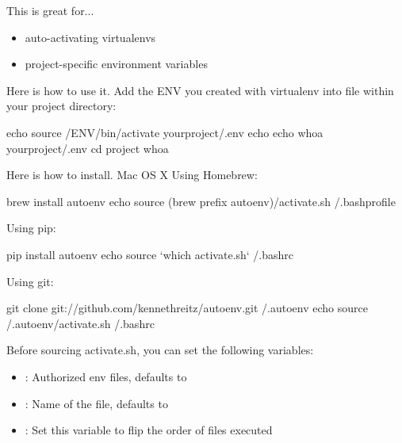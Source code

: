 This is great for...
\begin{itemize}
\item {} 
auto-activating virtualenvs

\item {} 
project-specific environment variables

\end{itemize}

Here is how to use it. Add the ENV you created with virtualenv into
 file within your project directory:

\begin{sphinxVerbatim}[commandchars=\\\{\}]
\PYGZdl{} echo \PYGZdq{}source \PYGZti{}/ENV/bin/activate\PYGZdq{} \PYGZgt{} yourproject/.env
\PYGZdl{} echo \PYGZdq{}echo \PYGZsq{}whoa\PYGZsq{}\PYGZdq{} \PYGZgt{} yourproject/.env
\PYGZdl{} cd project
whoa
\end{sphinxVerbatim}

Here is how to install.
Mac OS X Using Homebrew:

\begin{sphinxVerbatim}[commandchars=\\\{\}]
\PYGZdl{} brew install autoenv
\PYGZdl{} echo \PYGZdq{}source \PYGZdl{}(brew \PYGZhy{}\PYGZhy{}prefix autoenv)/activate.sh\PYGZdq{} \PYGZgt{}\PYGZgt{} \PYGZti{}/.bash\PYGZus{}profile
\end{sphinxVerbatim}

Using pip:

\begin{sphinxVerbatim}[commandchars=\\\{\}]
\PYGZdl{} pip install autoenv
\PYGZdl{} echo \PYGZdq{}source {}`which activate.sh{}`\PYGZdq{} \PYGZgt{}\PYGZgt{} \PYGZti{}/.bashrc
\end{sphinxVerbatim}

Using git:

\begin{sphinxVerbatim}[commandchars=\\\{\}]
\PYGZdl{} git clone git://github.com/kennethreitz/autoenv.git \PYGZti{}/.autoenv
\PYGZdl{} echo \PYGZsq{}source \PYGZti{}/.autoenv/activate.sh\PYGZsq{} \PYGZgt{}\PYGZgt{} \PYGZti{}/.bashrc
\end{sphinxVerbatim}

Before sourcing activate.sh, you can set the following variables:
\begin{itemize}
\item {} 
: Authorized env files, defaults to 

\item {} 
: Name of the  file, defaults to 

\item {} 
: Set this variable to flip the order of  files executed

\end{itemize}

